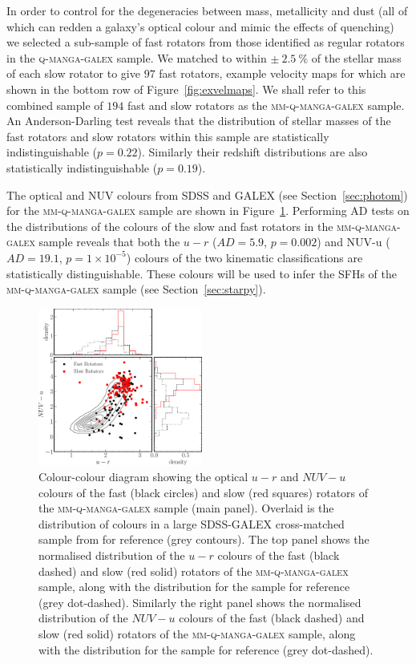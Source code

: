 \documentclass[useAMS,usenatbib]{mn2e}
\begin{document}
In order to control for the degeneracies between mass, metallicity and dust (all of which can redden a galaxy's optical colour and mimic the effects of quenching) we selected a sub-sample of fast rotators from those identified as regular rotators in the \textsc{q-manga-galex} sample. We matched to within $\pm~2.5~\%$ of the stellar mass of each slow rotator to give $97$ fast rotators, example velocity maps for which are shown in the bottom row of Figure~\ref{fig:exvelmaps}. We shall refer to this combined sample of $194$ fast and slow rotators as the \textsc{mm-q-manga-galex} sample. An Anderson-Darling \citep[AD;][]{anderson52} test reveals that the distribution of stellar masses of the fast rotators and slow rotators within this sample are statistically indistinguishable ($p=0.22$). Similarly their redshift distributions are also statistically indistinguishable ($p=0.19$).

The optical and NUV colours from SDSS and GALEX (see Section~\ref{sec:photom}) for the \textsc{mm-q-manga-galex} sample are shown in Figure~\ref{fig:colcol}. Performing AD tests on the distributions of the colours of the slow and fast rotators in the \textsc{mm-q-manga-galex} sample reveals that both the $u-r$ ($AD= 5.9$, $p = 0.002$) and NUV-u ($AD= 19.1$, $p = 1\times10^{-5}$) colours of the two kinematic classifications are statistically distinguishable. These colours will be used to infer the SFHs of the \textsc{mm-q-manga-galex} sample (see Section~\ref{sec:starpy}).

\begin{figure}
\centering
\includegraphics[width=0.48\textwidth]{../figures/colour_colour_FR_SR_VOR10_nonkdc.pdf}
\caption{Colour-colour diagram showing the optical $u-r$ and $NUV-u$ colours of the fast (black circles) and slow (red squares) rotators of the \textsc{mm-q-manga-galex} sample (main panel). Overlaid is the distribution of colours in a large SDSS-GALEX cross-matched sample from \protect\cite{smethurst15} for reference (grey contours). The top panel shows the normalised distribution of the $u-r$ colours of the fast (black dashed) and slow (red solid) rotators of the \textsc{mm-q-manga-galex} sample, along with the distribution for the \protect\cite{smethurst15} sample for reference (grey dot-dashed). Similarly the right panel shows the normalised distribution of the $NUV-u$ colours of the fast (black dashed) and slow (red solid) rotators of the \textsc{mm-q-manga-galex} sample, along with the distribution for the \protect\cite{smethurst15} sample for reference (grey dot-dashed).}
\label{fig:colcol}
\end{figure} 
\end{document}
